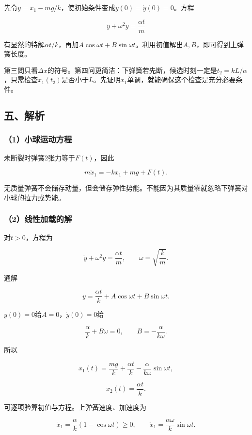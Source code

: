 \documentclass[12pt,a4paper,fontset=fandol]{ctexart}
\begin{document}
先令\(y=x_1-mg/k\)，使初始条件变成\(y(0)=\dot y(0)=0\)。方程

\[
\ddot y+\omega^2y=\frac{\alpha t}{m}
\]

有显然的特解\(\alpha t/k\)，再加\(A\cos\omega t+B\sin\omega t\)。利用初值解出\(A,B\)，即可得到上弹簧长度。

第三問只看\(\Delta x\)的符号。第四问更简洁：下弹簧若先断，候选时刻一定是\(t_2=kL/\alpha\)，只需检查\(x_1(t_2)\)是否小于\(L\)。先证明\(x_1\)单调，就能确保这个检查是充分必要条件。

\subsection{五、解析}\label{ux4e94ux89e3ux6790-4}

\subsubsection{（1）小球运动方程}\label{ux5c0fux7403ux8fd0ux52a8ux65b9ux7a0b}

未断裂时弹簧2张力等于\(F(t)\)，因此

\[
\boxed{m\ddot x_1=-kx_1+mg+F(t)}.
\]

无质量弹簧不会储存动量，但会储存弹性势能。不能因为其质量零就忽略下弹簧对小球的拉力或势能。

\subsubsection{（2）线性加载的解}\label{ux7ebfux6027ux52a0ux8f7dux7684ux89e3}

对\(t>0\)，方程为

\[
\ddot y+\omega^2y=\frac{\alpha t}{m},
\qquad \omega=\sqrt{\frac km}.
\]

通解

\[
y=\frac{\alpha t}{k}+A\cos\omega t+B\sin\omega t.
\]

\(y(0)=0\)给\(A=0\)，\(\dot y(0)=0\)给

\[
\frac\alpha k+B\omega=0,
\qquad B=-\frac{\alpha}{k\omega}.
\]

所以

\[
\boxed{x_1(t)=\frac{mg}k+\frac{\alpha t}k
-\frac{\alpha}{k\omega}\sin\omega t},
\]

\[
\boxed{x_2(t)=\frac{\alpha t}k}.
\]

可逐项验算初值与方程。上弹簧速度、加速度为

\[
\dot x_1=\frac\alpha k(1-\cos\omega t)\geq0,
\qquad
\ddot x_1=\frac{\alpha\omega}k\sin\omega t.
\]
\end{document}

